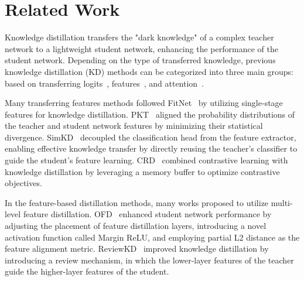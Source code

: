 \section{Related Work}
\label{Related_Work}
Knowledge distillation transfers the "dark knowledge" of a complex teacher network to a lightweight student network, enhancing the performance of the student network.
Depending on the type of transferred knowledge, previous knowledge distillation (KD) methods can be categorized into three main groups: based on transferring logits~\cite{hinton2015distilling,luo2024scale,zhao2022decoupled,sun2024logit,jin2023multi,li2023curriculum}, features~\cite{romero2014fitnets,tian2019contrastive,chen2022knowledge,chen2021distilling,heo2019comprehensive,park2019relational,ahn2019variational}, and attention~\cite{zagoruyko2016paying,guo2023class}.

Many transferring features methods followed FitNet~\cite{romero2014fitnets} by utilizing single-stage features for knowledge distillation. 
PKT~\cite{passalis2020probabilistic} aligned the probability distributions of the teacher and student network features by minimizing their statistical divergence. 
SimKD~\cite{chen2022knowledge} decoupled the classification head from the feature extractor, enabling effective knowledge transfer by directly reusing the teacher's classifier to guide the student's feature learning. 
CRD~\cite{tian2019contrastive} combined contrastive learning with knowledge distillation by leveraging a memory buffer to optimize contrastive objectives.

In the feature-based distillation methods, many works proposed to utilize multi-level feature distillation.
OFD~\cite{heo2019comprehensive} enhanced student network performance by adjusting the placement of feature distillation layers, introducing a novel activation function called Margin ReLU, and employing partial L2 distance as the feature alignment metric.
ReviewKD~\cite{chen2021distilling} improved knowledge distillation by introducing a review mechanism, in which the lower-layer features of the teacher guide the higher-layer features of the student.

